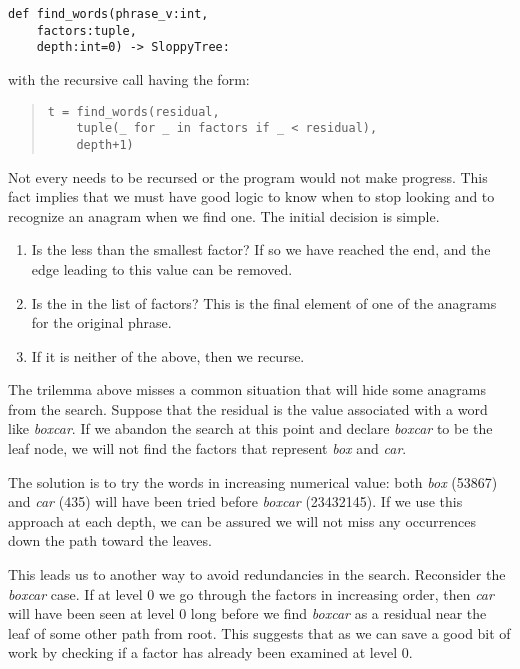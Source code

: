 \documentclass[letterpaper, 11pt]{article}
\begin{document}
\begin{verbatim}
def find_words(phrase_v:int,
    factors:tuple,
    depth:int=0) -> SloppyTree:
\end{verbatim}

with the recursive call having the form:

\begin{quote}
\begin{verbatim}
t = find_words(residual, 
    tuple(_ for _ in factors if _ < residual), 
    depth+1)
\end{verbatim}
\end{quote}

Not every  needs to be recursed or the program would
not make progress. This fact implies that we must have good logic
to know when to stop looking and to recognize an anagram when we
find one. The initial decision is simple.

\begin{enumerate}
\item Is the  less than the smallest factor? If so
we have reached the end, and the edge leading to this value can
be removed.

\item Is the  in the list of factors? This is the final
element of one of the anagrams for the original phrase.

\item If it is neither of the above, then we recurse.

\end{enumerate}

The trilemma above misses a common situation that will hide some 
anagrams from the search. Suppose that the residual is the value
associated with a word like \emph{boxcar}. If we abandon the
search at this point and declare \emph{boxcar} to be the leaf node,
we will not find the factors that represent \emph{box} and \emph{car}.

The solution is to try the words in increasing numerical value: both
\emph{box} (53867) and \emph{car} (435) will have been tried 
before \emph{boxcar} (23432145). If we use this approach at each 
depth, we can be assured we will not miss any occurrences down the
path toward the leaves.

This leads us to another way to avoid redundancies in the search.
Reconsider the \emph{boxcar} case. If at level $0$ we go through the
factors in increasing order, then \emph{car} will have been seen at
level $0$ long before we find \emph{boxcar} as a residual near the
leaf of some other path from root. This suggests that as we can save
a good bit of work by checking if a factor has already been examined
at level $0$.
\end{document}
